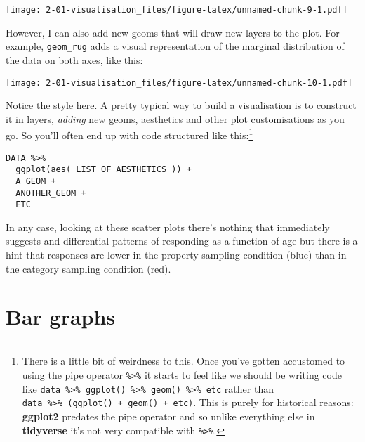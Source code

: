 \documentclass[]{book}
\newenvironment{Shaded}{\begin{snugshade}}{\end{snugshade}}
\newcommand{\DataTypeTok}[1]{\textcolor[rgb]{0.13,0.29,0.53}{#1}}
\newcommand{\KeywordTok}[1]{\textcolor[rgb]{0.13,0.29,0.53}{\textbf{#1}}}
\newcommand{\NormalTok}[1]{#1}
\newcommand{\OperatorTok}[1]{\textcolor[rgb]{0.81,0.36,0.00}{\textbf{#1}}}
\newcommand{\StringTok}[1]{\textcolor[rgb]{0.31,0.60,0.02}{#1}}
\let\rmarkdownfootnote\footnote%
\def\footnote{\protect\rmarkdownfootnote}
\begin{document}
\texttt{[image: 2-01-visualisation\_files/figure-latex/unnamed-chunk-9-1.pdf]}

However, I can also add new geoms that will draw new layers to the plot. For example, \texttt{geom\_rug} adds a visual representation of the marginal distribution of the data on both axes, like this:

\begin{Shaded}
\end{Shaded}

\texttt{[image: 2-01-visualisation\_files/figure-latex/unnamed-chunk-10-1.pdf]}

Notice the style here. A pretty typical way to build a visualisation is to construct it in layers, \emph{adding} new geoms, aesthetics and other plot customisations as you go. So you'll often end up with code structured like this:\footnote{There is a little bit of weirdness to this. Once you've gotten accustomed to using the pipe operator \texttt{\%\textgreater{}\%} it starts to feel like we should be writing code like \texttt{data\ \%\textgreater{}\%\ ggplot()\ \%\textgreater{}\%\ geom()\ \%\textgreater{}\%\ etc} rather than \texttt{data\ \%\textgreater{}\%\ (ggplot()\ +\ geom()\ +\ etc)}. This is purely for historical reasons: \textbf{ggplot2} predates the pipe operator and so unlike everything else in \textbf{tidyverse} it's not very compatible with \texttt{\%\textgreater{}\%}.}

\begin{verbatim}
DATA %>%
  ggplot(aes( LIST_OF_AESTHETICS )) +
  A_GEOM +
  ANOTHER_GEOM +
  ETC
\end{verbatim}

In any case, looking at these scatter plots there's nothing that immediately suggests and differential patterns of responding as a function of age but there is a hint that responses are lower in the property sampling condition (blue) than in the category sampling condition (red).

\hypertarget{bar-graphs}{%
\section{Bar graphs}\label{bar-graphs}}
\end{document}
